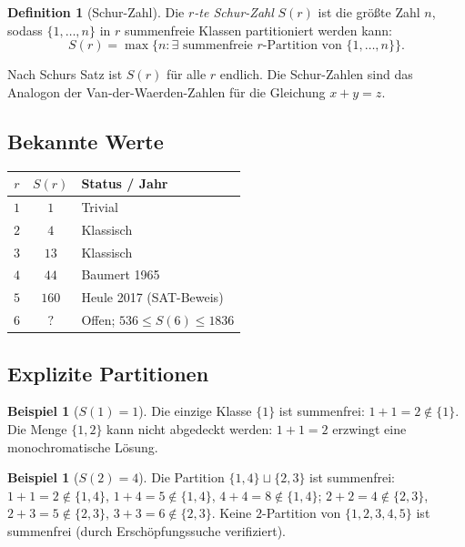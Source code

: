 \documentclass[12pt,a4paper]{amsart}
\theoremstyle{definition}
\newtheorem{definition}[theorem]{Definition}
\newtheorem{example}[theorem]{Beispiel}
\begin{document}
\begin{definition}[Schur-Zahl]
Die \emph{$r$-te Schur-Zahl} $S(r)$ ist die größte Zahl $n$, sodass
$\{1, \ldots, n\}$ in $r$ summenfreie Klassen partitioniert werden kann:
\[
  S(r) = \max\bigl\{n : \exists \text{ summenfreie $r$-Partition von } \{1,\ldots,n\}\bigr\}.
\]
\end{definition}

Nach Schurs Satz ist $S(r)$ für alle $r$ endlich. Die Schur-Zahlen sind das Analogon
der Van-der-Waerden-Zahlen für die Gleichung $x + y = z$.

\subsection{Bekannte Werte}

\begin{center}
\begin{tabular}{ccl}
\toprule
$r$ & $S(r)$ & Status / Jahr \\
\midrule
$1$ & $1$   & Trivial \\
$2$ & $4$   & Klassisch \\
$3$ & $13$  & Klassisch \\
$4$ & $44$  & Baumert 1965 \cite{Baumert1965} \\
$5$ & $160$ & Heule 2017 \cite{Heule2017} (SAT-Beweis) \\
$6$ & $?$   & Offen; $536 \leq S(6) \leq 1836$ \\
\bottomrule
\end{tabular}
\end{center}

\subsection{Explizite Partitionen}

\begin{example}[$S(1) = 1$]
Die einzige Klasse $\{1\}$ ist summenfrei: $1 + 1 = 2 \notin \{1\}$.
Die Menge $\{1, 2\}$ kann nicht abgedeckt werden: $1 + 1 = 2$ erzwingt eine
monochromatische Lösung.
\end{example}

\begin{example}[$S(2) = 4$]
Die Partition $\{1,4\} \sqcup \{2,3\}$ ist summenfrei:
$1+1=2\notin\{1,4\}$, $1+4=5\notin\{1,4\}$, $4+4=8\notin\{1,4\}$;
$2+2=4\notin\{2,3\}$, $2+3=5\notin\{2,3\}$, $3+3=6\notin\{2,3\}$.
Keine $2$-Partition von $\{1,2,3,4,5\}$ ist summenfrei (durch Erschöpfungssuche
verifiziert).
\end{example}
\end{document}
